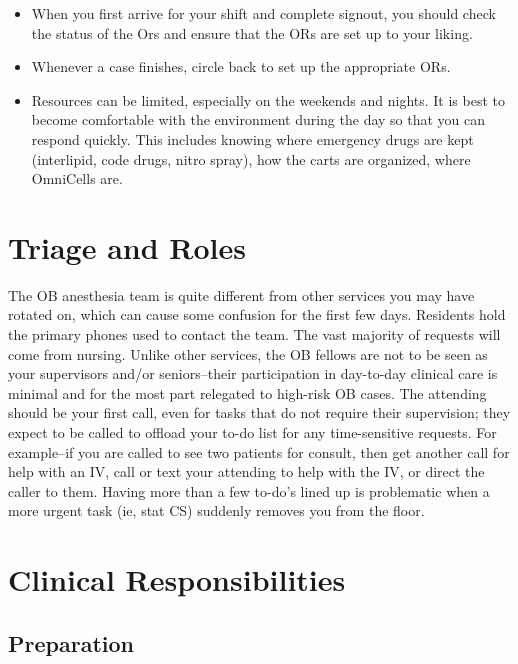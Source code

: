 \documentclass[twoside,8pt]{extarticle}
\providecommand{\tightlist}{%
}
\begin{document}
\begin{itemize}
\tightlist
\item
  When you first arrive for your shift and complete signout, you should
  check the status of the Ors and ensure that the ORs are set up to your
  liking.
\item
  Whenever a case finishes, circle back to set up the appropriate ORs.
\item
  Resources can be limited, especially on the weekends and nights. It is
  best to become comfortable with the environment during the day so that
  you can respond quickly. This includes knowing where emergency drugs
  are kept (interlipid, code drugs, nitro spray), how the carts are
  organized, where OmniCells are.
\end{itemize}

\section{Triage and Roles}\label{triage-and-roles-1}

The OB anesthesia team is quite different from other services you may
have rotated on, which can cause some confusion for the first few days.
Residents hold the primary phones used to contact the team. The vast
majority of requests will come from nursing. Unlike other services, the
OB fellows are not to be seen as your supervisors and/or seniors--their
participation in day-to-day clinical care is minimal and for the most
part relegated to high-risk OB cases. The attending should be your first
call, even for tasks that do not require their supervision; they expect
to be called to offload your to-do list for any time-sensitive requests.
For example--if you are called to see two patients for consult, then get
another call for help with an IV, call or text your attending to help
with the IV, or direct the caller to them. Having more than a few
to-do's lined up is problematic when a more urgent task (ie, stat CS)
suddenly removes you from the floor.

\section{Clinical Responsibilities}\label{clinical-responsibilities}

\subsection{Preparation}\label{preparation-2}
\end{document}
